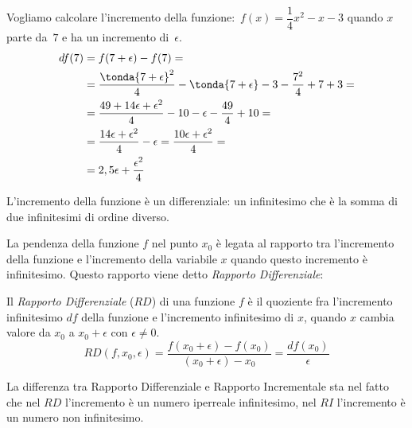 \begin{minipage}{.48 \textwidth}
\begin{esempio}
Vogliamo calcolare l'incremento della 
funzione:~\(f(x) = \dfrac{1}{4} x^2 -x -3\)
quando \(x\) parte da~\(7\) e ha un incremento di~\(\epsilon\).
\begin{align*}
  df(7) &= f(7+\epsilon) - f(7) = \\
        &= \dfrac{\tonda{7 +\epsilon}^2}{4}  -\tonda{7 +\epsilon} -3 - 
           \dfrac{7^2}{4}  +7 +3 =\\
        &= \dfrac{49 +14 \epsilon +\epsilon^2}{4} -10 -\epsilon - 
           \dfrac{49}{4} +10 =\\
        &= \dfrac{14 \epsilon +\epsilon^2}{4} -\epsilon 
        = \dfrac{10 \epsilon +\epsilon^2}{4} =\\
        &= 2,5 \epsilon + \dfrac{\epsilon^2}{4}
\end{align*}
\end{esempio}
\end{minipage}
 \hfill
\begin{minipage}{.48 \textwidth}
 \begin{center}
\differenziale
 \end{center}
\end{minipage}
L'incremento della funzione è un differenziale: un infinitesimo che è la 
somma di due infinitesimi di ordine diverso. 


La pendenza della funzione \(f\) nel punto \(x_0\) è legata al 
rapporto tra l'incremento della funzione e l'incremento della variabile 
\(x\) quando questo incremento è infinitesimo. 
Questo rapporto viene detto \emph{Rapporto Differenziale}:
\begin{definizione}
Il \emph{Rapporto Differenziale} (\(RD\)) di una funzione \(f\) è il 
quoziente fra l'incremento infinitesimo \(df\) della funzione 
e l'incremento infinitesimo di \(x\), quando \(x\) cambia valore da 
\(x_0\) a \(x_0+\epsilon\) con \(\epsilon \ne 0\).
\[RD(f, x_0, \epsilon) = 
\frac{f(x_0+\epsilon)-f(x_0)}{(x_0+\epsilon)- x_0} =
\frac{df(x_0)}{\epsilon}\]
\end{definizione}
La differenza tra Rapporto Differenziale e Rapporto Incrementale sta nel 
fatto che nel \(RD\) l'incremento è un numero iperreale infinitesimo, 
nel \(RI\) l'incremento è un numero non infinitesimo.

